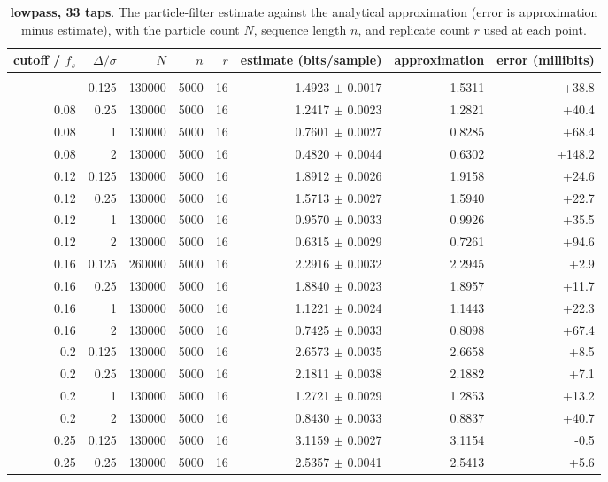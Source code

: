 {\small
\begin{longtable}[]{@{}rrrrrrrr@{}}
\toprule\noalign{}
cutoff / $f_s$ & $\Delta/\sigma$ & $N$ & $n$ & $r$ & estimate (bits/sample) & approximation & error (millibits) \\
\midrule\noalign{}
\endhead
\bottomrule\noalign{}
\caption{\textbf{lowpass, 33 taps}. The particle-filter estimate against the analytical approximation (error is approximation minus estimate), with the particle count $N$, sequence length $n$, and replicate count $r$ used at each point.}\label{tab:family4}\\
\endlastfoot
0.08 & 0.125 & 130000 & 5000 & 16 & 1.4923 $\pm$ 0.0017 & 1.5311 & +38.8 \\
0.08 & 0.25 & 130000 & 5000 & 16 & 1.2417 $\pm$ 0.0023 & 1.2821 & +40.4 \\
0.08 & 1 & 130000 & 5000 & 16 & 0.7601 $\pm$ 0.0027 & 0.8285 & +68.4 \\
0.08 & 2 & 130000 & 5000 & 16 & 0.4820 $\pm$ 0.0044 & 0.6302 & +148.2 \\
0.12 & 0.125 & 130000 & 5000 & 16 & 1.8912 $\pm$ 0.0026 & 1.9158 & +24.6 \\
0.12 & 0.25 & 130000 & 5000 & 16 & 1.5713 $\pm$ 0.0027 & 1.5940 & +22.7 \\
0.12 & 1 & 130000 & 5000 & 16 & 0.9570 $\pm$ 0.0033 & 0.9926 & +35.5 \\
0.12 & 2 & 130000 & 5000 & 16 & 0.6315 $\pm$ 0.0029 & 0.7261 & +94.6 \\
0.16 & 0.125 & 260000 & 5000 & 16 & 2.2916 $\pm$ 0.0032 & 2.2945 & +2.9 \\
0.16 & 0.25 & 130000 & 5000 & 16 & 1.8840 $\pm$ 0.0023 & 1.8957 & +11.7 \\
0.16 & 1 & 130000 & 5000 & 16 & 1.1221 $\pm$ 0.0024 & 1.1443 & +22.3 \\
0.16 & 2 & 130000 & 5000 & 16 & 0.7425 $\pm$ 0.0033 & 0.8098 & +67.4 \\
0.2 & 0.125 & 130000 & 5000 & 16 & 2.6573 $\pm$ 0.0035 & 2.6658 & +8.5 \\
0.2 & 0.25 & 130000 & 5000 & 16 & 2.1811 $\pm$ 0.0038 & 2.1882 & +7.1 \\
0.2 & 1 & 130000 & 5000 & 16 & 1.2721 $\pm$ 0.0029 & 1.2853 & +13.2 \\
0.2 & 2 & 130000 & 5000 & 16 & 0.8430 $\pm$ 0.0033 & 0.8837 & +40.7 \\
0.25 & 0.125 & 130000 & 5000 & 16 & 3.1159 $\pm$ 0.0027 & 3.1154 & -0.5 \\
0.25 & 0.25 & 130000 & 5000 & 16 & 2.5357 $\pm$ 0.0041 & 2.5413 & +5.6 \\

\end{longtable}}
